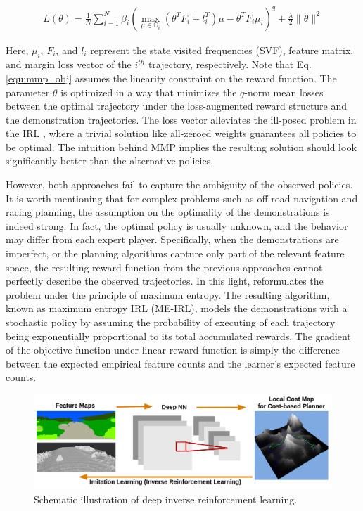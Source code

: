 \documentclass[../thesis.tex]{subfiles}
\begin{document}
\begin{align}
L(\theta) = \frac{1}{N} \sum^{N}_{i=1} \beta_i ( \max_{\mu \in \mathbb{G}_i}(\theta^T F_i + l_i^T)\mu - \theta^TF_i\mu_i )^q +  \frac{\lambda}{2} \| \theta \|^2 \label{equ:mmp_obj}
\end{align}

Here, $\mu_i$, $F_i$, and $l_i$ represent the state visited frequencies (SVF), feature matrix, and margin loss vector of the $i^{th}$ trajectory, respectively.
Note that Eq. \ref{equ:mmp_obj} assumes the linearity constraint on the reward function.
The parameter $\theta$ is optimized in a way that minimizes the $q$-norm mean losses between the optimal trajectory under the loss-augmented reward structure and the demonstration trajectories.
The loss vector alleviates the ill-posed problem in the IRL \cite{abbeel2004apprenticeship}, where a trivial solution like all-zeroed weights guarantees all policies to be optimal.
The intuition behind MMP implies the resulting solution should look significantly better than the alternative policies.
 
However, both approaches fail to capture the ambiguity of the observed policies.
It is worth mentioning that for complex problems such as off-road navigation and racing planning, the assumption on the optimality of the demonstrations is indeed strong. 
In fact, the optimal policy is usually unknown, and the behavior may differ from each expert player.
Specifically, when the demonstrations are imperfect, or the planning algorithms capture only part of the relevant feature space, the resulting reward function from the previous approaches cannot perfectly describe the observed trajectories.
In this light, \citet{ziebart2008maximum} reformulates the problem under the principle of maximum entropy.
The resulting algorithm, known as maximum entropy IRL (ME-IRL), models the demonstrations with a stochastic policy by assuming the probability of executing of each trajectory being exponentially proportional to its total accumulated rewards.
The gradient of the objective function under linear reward function is simply the difference between the expected empirical feature counts and the learner's expected feature counts.
 
 
 
\begin{figure}[t]
      \begin{center}
       \centerline{\includegraphics[width=0.9\columnwidth]{./DIRL/fig/dirl_pipeline.png}}
            \caption{Schematic illustration of deep inverse reinforcement learning.}
            \label{fig:dirl_diagram}
      \end{center}
      \vskip -0.5in
\end{figure}
 
\end{document}
